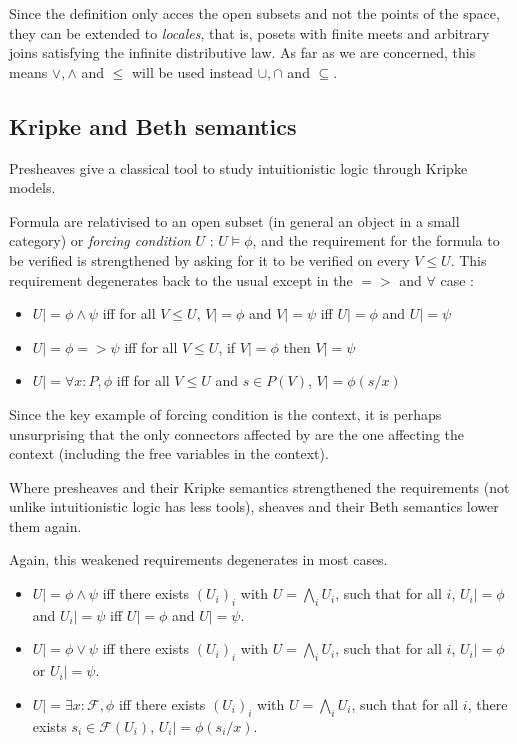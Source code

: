\documentclass[11pt]{article}
\newcommand{\0}{\mathbf{0}}
\newcommand{\1}{\mathbf{1}}
\begin{document}
Since the definition only acces the open subsets and not the points of the space, they can be extended to \emph{locales}, that is, posets with finite meets and arbitrary joins satisfying the infinite distributive law. As far as we are concerned, this means $\vee,\wedge$ and $\leq$ will be used instead $\cup,\cap$ and $\subseteq$.

\subsection{Kripke and Beth semantics}

Presheaves give a classical tool to study intuitionistic logic through Kripke models. 

Formula are relativised to an open subset (in general an object in a small category) or \emph{forcing condition} $U$ : $U \models \phi$, and the requirement for the formula to be verified is strengthened by asking for it to be verified on every $V\leq U$. This requirement degenerates back to the usual except in the $=>$ and $\forall$ case : 
\begin{itemize}
    \item $U |= \phi \wedge \psi$ iff for all $V\leq U$, $V |= \phi$ and $V |= \psi$ iff $U |= \phi$ and $U |= \psi$
    \item $U |= \phi => \psi$ iff for all $V \leq U$, if $V |= \phi$ then $V |= \psi $
    \item $U |= \forall x : P, \phi$ iff for all $V \leq U$ and $s\in P(V)$, $V |= \phi(s/x) $
\end{itemize}

Since the key example of forcing condition is the context, it is perhaps unsurprising that the only connectors affected by are the one affecting the context (including the free variables in the context).

Where presheaves and their Kripke semantics strengthened the requirements (not unlike intuitionistic logic has less tools), sheaves and their Beth semantics lower them again.

Again, this weakened requirements degenerates in most cases.

\begin{itemize}
    \item $U |= \phi \wedge \psi$ iff there exists $(U_i)_i$ with $U = \bigwedge_i U_i$, such that for all $i$, $U_i |= \phi$ and $U_i |= \psi $ iff $U |= \phi$ and $U |= \psi$.
    \item $U |= \phi \vee \psi $ iff there exists $(U_i)_i$ with $U = \bigwedge_i U_i$, such that for all $i$, $U_i |= \phi$ or $U_i |= \psi $.
    \item $U |= \exists x : \mathcal{F}, \phi $ iff there exists $(U_i)_i$ with $U = \bigwedge_i U_i$, such that for all $i$, there exists $s_i\in \mathcal{F}(U_i)$, $U_i |= \phi(s_i/x)$.
\end{itemize}
\end{document}
